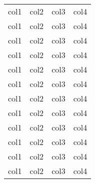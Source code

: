 \documentclass[a4paper,12pt]{article}                       %
\begin{document}
\begin{longtable}{|c|c|c|c|}
    col1          & col2          & col3          & col4          \\
    col1          & col2          & col3          & col4          \\
    col1          & col2          & col3          & col4          \\
    col1          & col2          & col3          & col4          \\
    col1          & col2          & col3          & col4          \\
    col1          & col2          & col3          & col4          \\
    col1          & col2          & col3          & col4          \\
    col1          & col2          & col3          & col4          \\
    col1          & col2          & col3          & col4          \\
    col1          & col2          & col3          & col4          \\
    col1          & col2          & col3          & col4          \\
    col1          & col2          & col3          & col4          \\
\end{longtable}
\end{document}
